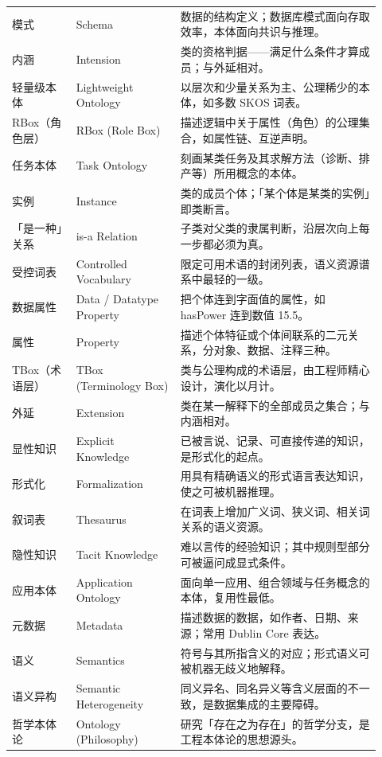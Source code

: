 \begin{longtable}{@{}p{0.16\linewidth}p{0.26\linewidth}p{0.5\linewidth}@{}}
模式 & Schema & 数据的结构定义；数据库模式面向存取效率，本体面向共识与推理。 \\
内涵 & Intension & 类的资格判据——满足什么条件才算成员；与外延相对。 \\
轻量级本体 & Lightweight Ontology & 以层次和少量关系为主、公理稀少的本体，如多数 SKOS 词表。 \\
RBox（角色层） & RBox (Role Box) & 描述逻辑中关于属性（角色）的公理集合，如属性链、互逆声明。 \\
任务本体 & Task Ontology & 刻画某类任务及其求解方法（诊断、排产等）所用概念的本体。 \\
实例 & Instance & 类的成员个体；「某个体是某类的实例」即类断言。 \\
「是一种」关系 & is-a Relation & 子类对父类的隶属判断，沿层次向上每一步都必须为真。 \\
受控词表 & Controlled Vocabulary & 限定可用术语的封闭列表，语义资源谱系中最轻的一级。 \\
数据属性 & Data / Datatype Property & 把个体连到字面值的属性，如 hasPower 连到数值 15.5。 \\
属性 & Property & 描述个体特征或个体间联系的二元关系，分对象、数据、注释三种。 \\
TBox（术语层） & TBox (Terminology Box) & 类与公理构成的术语层，由工程师精心设计，演化以月计。 \\
外延 & Extension & 类在某一解释下的全部成员之集合；与内涵相对。 \\
显性知识 & Explicit Knowledge & 已被言说、记录、可直接传递的知识，是形式化的起点。 \\
形式化 & Formalization & 用具有精确语义的形式语言表达知识，使之可被机器推理。 \\
叙词表 & Thesaurus & 在词表上增加广义词、狭义词、相关词关系的语义资源。 \\
隐性知识 & Tacit Knowledge & 难以言传的经验知识；其中规则型部分可被逼问成显式条件。 \\
应用本体 & Application Ontology & 面向单一应用、组合领域与任务概念的本体，复用性最低。 \\
元数据 & Metadata & 描述数据的数据，如作者、日期、来源；常用 Dublin Core 表达。 \\
语义 & Semantics & 符号与其所指含义的对应；形式语义可被机器无歧义地解释。 \\
语义异构 & Semantic Heterogeneity & 同义异名、同名异义等含义层面的不一致，是数据集成的主要障碍。 \\
哲学本体论 & Ontology (Philosophy) & 研究「存在之为存在」的哲学分支，是工程本体论的思想源头。 \\

\end{longtable}
